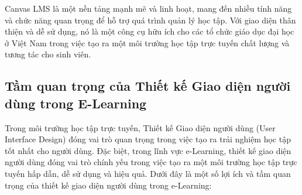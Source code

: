 \documentclass[../Thesis.tex]{subfiles}
\begin{document}
	Canvas LMS là một nền tảng mạnh mẽ và linh hoạt, mang đến nhiều tính năng và chức năng quan trọng để hỗ trợ quá trình quản lý học tập. Với giao diện thân thiện và dễ sử dụng, nó là một công cụ hữu ích cho các tổ chức giáo dục đại học ở Việt Nam trong việc tạo ra một môi trường học tập trực tuyến chất lượng và tương tác cho sinh viên.

	\subsection{Tầm quan trọng của Thiết kế Giao diện người dùng trong E-Learning}
	Trong môi trường học tập trực tuyến, Thiết kế Giao diện người dùng (User Interface Design) đóng vai trò quan trọng trong việc tạo ra trải nghiệm học tập tốt nhất cho người dùng. Đặc biệt, trong lĩnh vực e-Learning, thiết kế giao diện người dùng đóng vai trò chính yếu trong việc tạo ra một môi trường học tập trực tuyến hấp dẫn, dễ sử dụng và hiệu quả. Dưới đây là một số lợi ích và tầm quan trọng của thiết kế giao diện người dùng trong e-Learning:
\end{document}
